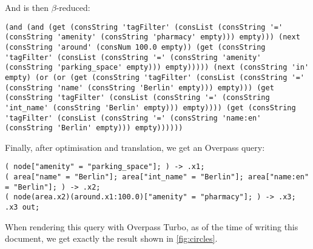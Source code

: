 \documentclass[main.tex]{subfiles}
\begin{document}
And is then $\beta$-reduced:
\begin{lstwrap}\begin{lstlisting}
(and (and (get (consString 'tagFilter' (consList (consString '=' (consString 'amenity' (consString 'pharmacy' empty))) empty))) (next (consString 'around' (consNum 100.0 empty)) (get (consString 'tagFilter' (consList (consString '=' (consString 'amenity' (consString 'parking_space' empty))) empty))))) (next (consString 'in' empty) (or (or (get (consString 'tagFilter' (consList (consString '=' (consString 'name' (consString 'Berlin' empty))) empty))) (get (consString 'tagFilter' (consList (consString '=' (consString 'int_name' (consString 'Berlin' empty))) empty)))) (get (consString 'tagFilter' (consList (consString '=' (consString 'name:en' (consString 'Berlin' empty))) empty))))))
\end{lstlisting}\end{lstwrap}

Finally, after optimisation and translation, we get an Overpass query:
\begin{lstwrap}\begin{lstlisting}
( node["amenity" = "parking_space"]; ) -> .x1;
( area["name" = "Berlin"]; area["int_name" = "Berlin"]; area["name:en" = "Berlin"]; ) -> .x2;
( node(area.x2)(around.x1:100.0)["amenity" = "pharmacy"]; ) -> .x3;
.x3 out;
\end{lstlisting}\end{lstwrap}

When rendering this query with Overpass Turbo, as of the time of writing this
document, we get exactly the result shown in \cref{fig:circles}.
\end{document}
